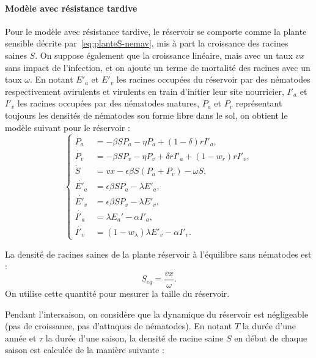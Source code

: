 \paragraph{Modèle avec résistance tardive}

Pour le modèle avec résistance tardive, le réservoir se comporte comme la plante sensible décrite par~\eqref{eq:planteS-nemav}, mis à part la croissance des racines saines $S$. On suppose également que la croissance linéaire, mais  avec un taux $vx$ sans impact de l'infection, et on ajoute un terme de mortalité des racines avec un taux $\omega$. En notant $E'_a$ et $E'_v$ les racines occupées du réservoir par des nématodes respectivement avirulents et virulents en train d'initier leur site nourricier,  $I'_a$ et $I'_v$ les racines occupées par des nématodes matures, $P_a$ et $P_v$ représentant toujours les densités de nématodes sou forme libre dans le sol, on obtient le modèle suivant pour le réservoir :
\begin{equation}
  \left\{
    \begin{aligned}
      \dot{P_a} & =- \beta S P_a - \eta P_a + (1-\delta) r  I'_a,\\
      \dot{P_v} & =- \beta S P_v - \eta P_v + \delta r  I'_a + (1-w_{r}) r I'_v,\\
      \dot{S} &= v x - \epsilon \beta S (P_a + P_v) - \omega S,\\
      \dot{E'_a} &= \epsilon \beta S P_a - \lambda  E'_a,\\
      \dot{E'_v} &= \epsilon \beta S P_v - \lambda E'_v,\\
      \dot{I'_a} & = \lambda E_a' - \alpha I'_a,\\
      \dot{I'_v} & = (1-w_{\lambda}) \lambda E'_v - \alpha I'_v.
    \end{aligned}
  \right.
  \label{eq:reservoir0}
\end{equation}

  
La densité de racines saines de la plante réservoir à l'équilibre sans nématodes est :  
\begin{equation}
  S_{eq} = \dfrac{vx}{\omega}.
  \label{eq:Seq}
\end{equation}
On utilise cette quantité pour mesurer la taille du réservoir.

Pendant l'intersaison, on considère que la dynamique du réservoir est négligeable (pas de croissance, pas d'attaques de nématodes). En notant $T$ la durée d'une année et $\tau$ la durée d'une saison, la densité de racine saine $S$ en début de chaque saison est calculée de la manière suivante : 

